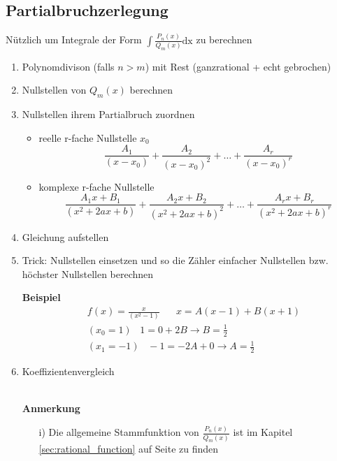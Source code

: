 \documentclass[8pt, a4paper, landscape, fleqn]{scrartcl}
\newenvironment {example}
				{\begin{itshape} \begin{small}}
				{\end{small} \end{itshape}}
\begin{document}
\begin{multicols*}{3}
			\subsection{Partialbruchzerlegung}
				Nützlich um Integrale der Form $\int \frac{P_n(x)}{Q_m(x)} \text{dx}$ zu berechnen
				\begin{enumerate}
					\item Polynomdivison (falls $n > m$) mit Rest (ganzrational + echt gebrochen)
					\item Nullstellen von $Q_m(x)$ berechnen
					\item Nullstellen ihrem Partialbruch zuordnen
					\begin{itemize}
						\item reelle r-fache Nullstelle $x_0$
						\[\frac{A_1}{(x-x_0)} + \frac{A_2}{(x-x_0)^2} + \ldots + \frac{A_r}{(x-x_0)^r}\]
						\item  komplexe r-fache Nullstelle
						\[\frac{A_1x + B_1}{(x^2+2ax+b)} + \frac{A_2x + B_2}{(x^2+2ax+b)^2} + \ldots + \frac{A_rx + B_r}{(x^2+2ax+b)^r}\]
					\end{itemize}
					\item Gleichung aufstellen
					\item Trick: Nullstellen einsetzen und so die Zähler einfacher Nullstellen bzw. höchster Nullstellen berechnen\\[3pt]						
					\begin{example}
						\textbf{Beispiel}
						\begin{align*}
						&f(x)=\frac{x}{(x^2-1)} \hspace{20pt}x = A(x-1) + B(x+1)\\
						&(x_0=1) \hspace{10pt} 1=0 + 2B \rightarrow B = \frac{1}{2}\\ &(x_1=-1) \hspace{10pt} -1=-2A + 0 \rightarrow A = \frac{1}{2}
						\end{align*}
					\end{example}
					\item Koeffizientenvergleich\\\\
					\begin{example}
						\textbf{Anmerkung}
						\begin{enumerate}
							\item[i)] Die allgemeine Stammfunktion von $\frac{P_n(x)}{Q_m(x)}$ ist im Kapitel \ref{sec:rational_function} auf Seite \pageref{sec:rational_function} zu finden
						\end{enumerate}			
					\end{example}
			\end{enumerate}

\end{multicols*}
\end{document}
